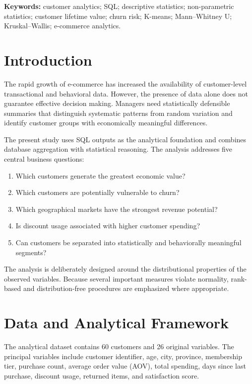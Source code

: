 \documentclass[11pt,a4paper]{article}
\begin{document}
\noindent\textbf{Keywords:} customer analytics; SQL; descriptive statistics;
non-parametric statistics; customer lifetime value; churn risk; K-means;
Mann--Whitney U; Kruskal--Wallis; e-commerce analytics.

\section{Introduction}

The rapid growth of e-commerce has increased the availability of
customer-level transactional and behavioral data. However, the presence
of data alone does not guarantee effective decision making. Managers need
statistically defensible summaries that distinguish systematic patterns
from random variation and identify customer groups with economically
meaningful differences.

The present study uses SQL outputs as the analytical foundation and
combines database aggregation with statistical reasoning. The analysis
addresses five central business questions:

\begin{enumerate}[label=\arabic*.]
    \item Which customers generate the greatest economic value?
    \item Which customers are potentially vulnerable to churn?
    \item Which geographical markets have the strongest revenue potential?
    \item Is discount usage associated with higher customer spending?
    \item Can customers be separated into statistically and behaviorally
    meaningful segments?
\end{enumerate}

The analysis is deliberately designed around the distributional properties
of the observed variables. Because several important measures violate
normality, rank-based and distribution-free procedures are emphasized
where appropriate.

\section{Data and Analytical Framework}

The analytical dataset contains 60 customers and 26 original variables.
The principal variables include customer identifier, age, city, province,
membership tier, purchase count, average order value (AOV), total spending,
days since last purchase, discount usage, returned items, and satisfaction
score.
\end{document}

